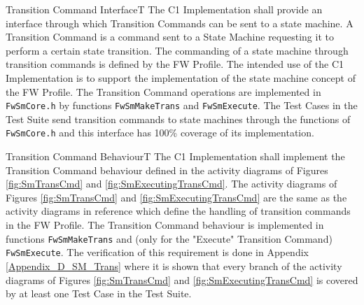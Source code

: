 \documentclass[requirements]{../fwprofile}
\begin{document}
\begin{fw_req_note}{Transition Command Interface}{T}
{The C1 Implementation shall provide an interface through which 
Transition Commands can be sent to a state machine.}
{A Transition Command is a command sent to a State Machine requesting it 
to perform a certain state transition.}
{The commanding of a state machine through transition commands 
is defined by the FW Profile. 
The intended use of the C1 Implementation is to support the implementation of the state
 machine concept of the FW Profile.}
{The Transition Command operations are implemented in 
\texttt{FwSmCore.h} by functions \texttt{FwSmMakeTrans} and \texttt{FwSmExecute}.} 
{The Test Cases in the Test Suite send transition commands 
to state machines through the functions of \texttt{FwSmCore.h} and this interface 
has 100\% coverage of its implementation.}
\end{fw_req_note}


\begin{fw_req}{Transition Command Behaviour}{T}
{The C1 Implementation shall implement the Transition Command behaviour defined in the activity diagrams of Figures \ref{fig:SmTransCmd} and \ref{fig:SmExecutingTransCmd}.}
{The activity diagrams of Figures \ref{fig:SmTransCmd} and \ref{fig:SmExecutingTransCmd} are the same as the activity diagrams in reference \cite{ref:fwprofile} which define the handling of transition commands in the FW Profile.}
{The Transition Command behaviour is implemented in functions \texttt{FwSmMakeTrans} and (only for the "Execute" Transition Command) \texttt{FwSmExecute}.} 
{The verification of this requirement is done in Appendix \ref{Appendix_D_SM_Trans} where it is shown that every branch of the activity diagrams of Figures \ref{fig:SmTransCmd} and \ref{fig:SmExecutingTransCmd} is covered by at least one Test Case in the Test Suite.}
\end{fw_req}
\end{document}
